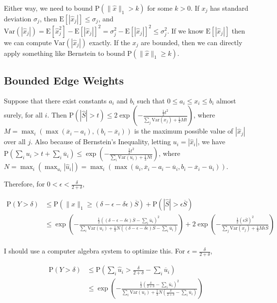 \documentclass{article}
\newcommand \E[1] {\mathrm E \left[#1\right]} %
\newcommand \Var[1] {\mathrm {Var} \left(#1\right)} %
\newcommand \p[1] {\mathrm P \left(#1\right)}
\begin{document}
Either way, we need to bound $\p{\|\hat x\|_1>k}$ for some $k>0$. If $x_j$ has standard deviation $\sigma_j$, then $\E{|\hat x_j|} \leq \sigma_j$, and $\Var{|\hat x_j|} = \E{\hat x_j^2}-\E{|\hat x_j|}^2 = \sigma_j^2 - \E{|\hat x_j|}^2 \leq \sigma_j^2$. If we know $\E{|\hat x_j|}$ then we can compute $\Var{|\hat x_j|}$ exactly. If the $x_j$ are bounded, then we can directly apply something like Bernstein to bound $\p{\|\hat x\|_1 \geq k}$.

\subsection{Bounded Edge Weights}
Suppose that there exist constants $a_i$ and $b_i$ such that $0\leq a_i\leq x_i\leq b_i$ almost surely, for all $i$. Then $\p{|\hat S|>t} \leq 2\exp\left(-\frac{\frac 1 2 t^2}{\sum_j \Var{x_j} + \frac 1 3 M t}\right)$, where $M=\max_i(\max(\overline x_i-a_i),(b_i-\overline x_i))$ is the maximum possible value of $|\hat x_j|$ over all $j$. Also because of Bernstein's Inequality, letting $u_i=|\hat x_i|$, we have $\p{\sum_i u_i > t + \sum_i \overline u_i} \leq \exp\left(-\frac{\frac 1 2 t^2}{\sum_i \Var{u_i} + \frac 1 3 N t}\right)$, where $N=\max_i(\max_{u_i} |\hat u_i|) = \max_i(\max(\overline u_i, \overline x_i-a_i-\overline u_i, b_i-\overline x_i-\overline u_i))$.

Therefore, for $0<\epsilon<\frac\delta{2+\delta}$,

\begin{align*}
\p{Y>\delta} &\leq \p{\|\hat x\|_1 \geq (\delta-\epsilon-\delta\epsilon)\overline S} + \p{|\hat S|>\epsilon\overline S} \\
&\leq \exp\left(-\frac{\frac 1 2 \left((\delta-\epsilon-\delta\epsilon)\overline S - \sum_i\overline u_i\right)^2}{\sum_i \Var{u_i} + \frac 1 3 N \left((\delta-\epsilon-\delta\epsilon)\overline S - \sum_i\overline u_i\right)}\right) + 2\exp\left(-\frac{\frac 1 2 (\epsilon\overline S)^2}{\sum_j \Var{x_j} + \frac 1 3 M \epsilon\overline S}\right) \\
\end{align*}

I should use a computer algebra system to optimize this. For $\epsilon = \frac\delta{2+\delta}$,

\begin{align*}
\p{Y>\delta} &\leq \p{\sum_i \hat u_i > \frac\delta{2+\delta} - \sum_i \overline u_i} \\
&\leq \exp\left(-\frac{\frac 1 2 ( \frac\delta{2+\delta} - \sum_i \overline u_i)^2}{\sum_i \Var{u_i} + \frac 1 3 N ( \frac\delta{2+\delta} - \sum_i \overline u_i)}\right)
\end{align*}
\end{document}
